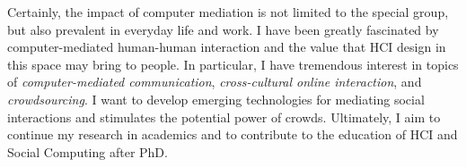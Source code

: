 \noindent
Certainly, the impact of computer mediation is not limited to the special group, 
but also prevalent in everyday life and work. 
I have been greatly fascinated by computer-mediated human-human interaction and the value that HCI design in this space may bring to people. 
In particular, I have tremendous interest in topics of 
\emph{computer-mediated communication}, \emph{cross-cultural online interaction}, and \emph{crowdsourcing}. 
I want to develop emerging technologies for mediating social interactions and stimulates the potential power of crowds. 
Ultimately, I aim to continue my research in academics and to contribute to the education of HCI and Social Computing after PhD.\\

























